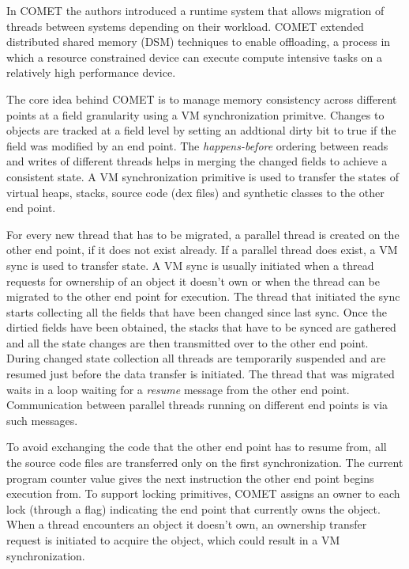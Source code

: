 In COMET the authors introduced a runtime system that allows migration of threads
between systems depending on their workload. COMET extended distributed
shared memory (DSM) techniques to enable offloading, a process in which
a resource constrained device can execute compute intensive tasks on a
relatively high performance device.

The core idea behind COMET is to manage memory consistency across different
points at a field
granularity using a VM synchronization primitve. Changes to objects are
tracked at a field level by setting an addtional dirty bit to true if the
field was modified by an end point. The \textit{happens-before} ordering
between reads and writes of different threads helps in merging the changed
fields to achieve a consistent state. A VM synchronization primitive is used
to transfer the states of virtual heaps, stacks, source code (dex files) and
synthetic classes to the other end point.


For every new thread that has to be migrated, a parallel thread is
created on the other end point, if it does not exist already. If a parallel
thread does exist, a VM sync is used to transfer state.
A VM sync is usually initiated when a thread requests for ownership of
an object it doesn't own or when the thread can be migrated to the other
end point for execution. The thread that initiated the sync starts
collecting all the fields that have been changed since last sync. Once the
dirtied fields have been obtained, the stacks that have to be synced are
gathered and all the state changes are then transmitted over to the other
end point. During changed state collection all threads are temporarily suspended
and are resumed just before the data transfer is initiated. The thread that was
migrated waits in a loop waiting for a \textit{resume} message from the other
end point. Communication between parallel threads running on different end points
is via such messages.


To avoid exchanging
the code that the other end point has to resume from, all the source code files are
transferred only on the first synchronization. The current program counter value
gives the next instruction the other end point begins execution from. To support
locking primitives, COMET assigns an owner to each lock (through a flag)
indicating the end point that currently owns the object. When a thread
encounters an object it doesn't own, an ownership transfer request is
initiated to acquire the object, which could result in a VM synchronization.

